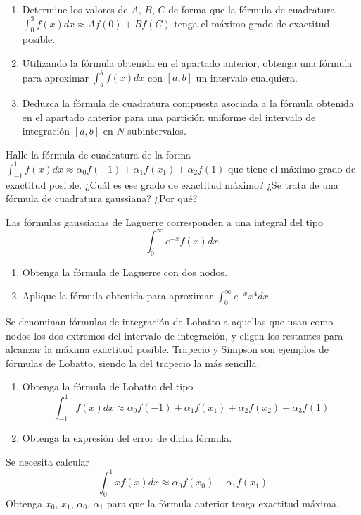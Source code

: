 \begin{ejercicio}\label{ej:2.1.26}~
    \begin{enumerate}
        \item Determine los valores de $A$, $B$, $C$ de forma que la fórmula de cuadratura $\int_{0}^{3} f(x) dx \approx Af(0) + Bf(C)$ tenga el máximo grado de exactitud posible.
        \item Utilizando la fórmula obtenida en el apartado anterior, obtenga una fórmula para aproximar $\int_{a}^{b} f(x) dx$ con $[a, b]$ un intervalo cualquiera.
        \item Deduzca la fórmula de cuadratura compuesta asociada a la fórmula obtenida en el apartado anterior para una partición uniforme del intervalo de integración $[a, b]$ en $N$ subintervalos.
    \end{enumerate}
\end{ejercicio}

\begin{ejercicio}\label{ej:2.1.27}
    Halle la fórmula de cuadratura de la forma $\int_{-1}^{1} f(x) dx \approx \alpha_0 f(-1) + \alpha_1 f(x_1) + \alpha_2 f(1)$ que tiene el máximo grado de exactitud posible. ¿Cuál es ese grado de exactitud máximo? ¿Se trata de una fórmula de cuadratura gaussiana? ¿Por qué?
\end{ejercicio}

\begin{ejercicio}\label{ej:2.1.28} Las fórmulas gaussianas de Laguerre corresponden a una integral del tipo
    \begin{equation*}
        \int_{0}^{\infty} e^{-x} f(x) dx.
    \end{equation*}
    \begin{enumerate}
        \item Obtenga la fórmula de Laguerre con dos nodos.
        \item Aplique la fórmula obtenida para aproximar $\int_{0}^{\infty} e^{-x} x^4 dx$.
    \end{enumerate}
\end{ejercicio}

\begin{ejercicio}\label{ej:2.1.29}
    Se denominan fórmulas de integración de Lobatto a aquellas que usan como nodos los dos extremos del intervalo de integración, y eligen los restantes para alcanzar la máxima exactitud posible. Trapecio y Simpson son ejemplos de fórmulas de Lobatto, siendo la del trapecio la más sencilla.
    \begin{enumerate}
        \item Obtenga la fórmula de Lobatto del tipo $$\int_{-1}^{1} f(x) dx \approx \alpha_0 f(-1) + \alpha_1 f(x_1) + \alpha_2 f(x_2) + \alpha_3 f(1)$$
        \item Obtenga la expresión del error de dicha fórmula.
    \end{enumerate}
\end{ejercicio}

\begin{ejercicio}\label{ej:2.1.30}
    Se necesita calcular $$\int_{0}^{1} x f(x) dx \approx \alpha_0 f(x_0) + \alpha_1 f(x_1)$$ Obtenga $x_0$, $x_1$, $\alpha_0$, $\alpha_1$ para que la fórmula anterior tenga exactitud máxima.
\end{ejercicio}